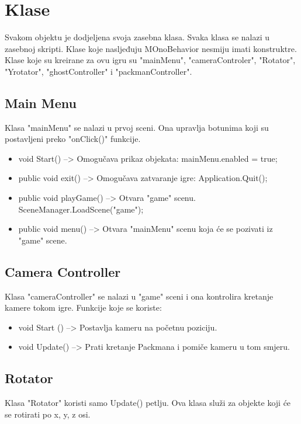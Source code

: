 \section{Klase}
Svakom objektu je dodjeljena svoja zasebna klasa. Svaka klasa se nalazi u zasebnoj skripti. Klase koje nasljeđuju MOnoBehavior nesmiju imati konstruktre.
Klase koje su kreirane za ovu igru su "mainMenu", "cameraControler", "Rotator", "Yrotator", "ghostController" i "packmanController".


\subsection{Main Menu}
Klasa "mainMenu" se nalazi u prvoj sceni. Ona upravlja botunima koji su postavljeni preko "onClick()" funkcije.
\begin{itemize}
\item void Start() --> Omogučava prikaz objekata:
 mainMenu.enabled = true;

\item public void exit() -->  Omogučava zatvaranje igre:
 Application.Quit();

\item public void playGame() --> Otvara "game" scenu.
 SceneManager.LoadScene("game");

\item public void menu() --> Otvara "mainMenu" scenu koja će se pozivati iz "game" scene.

\end{itemize}
\subsection{Camera Controller}

Klasa "cameraController" se nalazi u "game" sceni i ona kontrolira kretanje kamere tokom igre. Funkcije koje se koriste:

\begin{itemize}
\item void Start () --> Postavlja kameru na početnu poziciju.
 
\item void Update() --> Prati kretanje Packmana i pomiče kameru u tom smjeru.
\end{itemize}
\subsection{Rotator}
Klasa "Rotator" koristi samo Update() petlju. Ova klasa služi za objekte koji će se rotirati po x, y, z osi.

